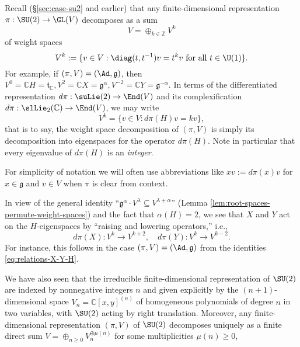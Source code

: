 \documentclass[reqno]{amsart} 
\begin{document}
Recall (\S\ref{sec:case-su2} and earlier) that any finite-dimensional representation $\pi : \SU(2) \rightarrow \GL(V)$ decomposes as a sum
\begin{equation*}
  V = \oplus_{k \in \mathbb{Z}} V^k
\end{equation*}
of weight spaces
\begin{equation*}
  V^k := \{v \in V : \diag(t,t^{-1}) v = t^k v \text{ for all } t \in \U(1) \}.
\end{equation*}
For example, if $(\pi,V) = (\Ad,\mathfrak{g})$, then $V^0 = \mathbb{C} H = \mathfrak{t}_{\mathbb{C}}, V^2 = \mathbb{C} X = \mathfrak{g}^{\alpha}, V^{-2} = \mathbb{C} Y = \mathfrak{g}^{-\alpha}$.  In terms of the differentiated representation $d \pi : \suLie(2) \rightarrow \End(V)$ and its complexification $d \pi : \slLie_2(\mathbb{C}) \rightarrow \End(V)$, we may write
\begin{equation*}
  V^k = \{v \in V : d \pi(H) v = k v \},
\end{equation*}
that is to say, the weight space decomposition of $(\pi,V)$ is simply its decomposition into eigenspaces for the operator $d \pi(H)$.  Note in particular that every eigenvalue of $d \pi(H)$ is an \emph{integer}.

For simplicity of notation we will often use abbreviations like $x v := d \pi(x) v$ for $x \in \mathfrak{g}$ and $v \in V$ when $\pi$ is clear from context.

In view of the general identity ``$\mathfrak{g}^\alpha \cdot V^{\lambda} \subseteq V^{\lambda+\alpha}$'' (Lemma \ref{lem:root-spaces-permute-weight-spaces}) and the fact that $\alpha(H) = 2$, we see that $X$ and $Y$ act on the $H$-eigenspaces by ``raising and lowering operators,'' i.e.,
\begin{equation*}
  d \pi(X) : V^k \rightarrow V^{k+2}, \quad d \pi(Y) : V^k
  \rightarrow V^{k-2}.
\end{equation*}
For instance, this follows in the case $(\pi,V) = (\Ad,\mathfrak{g})$ from the identities \eqref{eq:relations-X-Y-H}.

We have also seen that the irreducible finite-dimensional representation of $\SU(2)$ are indexed by nonnegative integers $n$ and given explicitly by the $(n+1)$-dimensional space $V_n = \mathbb{C}[x,y]^{(n)}$ of homogeneous polynomials of degree $n$ in two variables, with $\SU(2)$ acting by right translation.  Moreover, any finite-dimensional representation $(\pi,V)$ of $\SU(2)$ decomposes uniquely as a finite direct sum $V = \oplus_{n \geq 0} V_n^{\oplus \mu(n)}$ for some multiplicities $\mu(n) \geq 0$,
\end{document}
